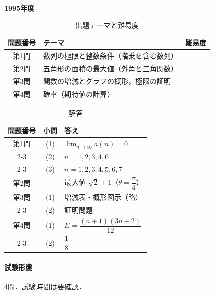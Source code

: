 \documentclass[../../main.tex]{subfiles}
\begin{document}
\begin{center}
  {\fontsize{48pt}{58pt}\selectfont \textbf{1995}\normalsize\textbf{年度}}
\end{center}

\begin{table}[htb]
  \centering
  \caption{出題テーマと難易度}
  \begin{tabular}{|c|p{9cm}|c|}
    \hline
    \textbf{問題番号} & \textbf{テーマ} & \textbf{難易度} \\
    \hline
    第1問 & 数列の極限と整数条件（階乗を含む数列） & \\
    \hline
    第2問 & 五角形の面積の最大値（外角と三角関数） & \\
    \hline
    第3問 & 関数の増減とグラフの概形，極限の証明 & \\
    \hline
    第4問 & 確率（期待値の計算） & \\
    \hline
  \end{tabular}
\end{table}

\begin{table}[htb]
  \centering
  \caption{解答}
  \renewcommand{\arraystretch}{1.4}
  \begin{tabular}{|c|c|p{9cm}|}
    \hline
    \textbf{問題番号} & \textbf{小問} & \textbf{答え} \\
    \hline
    第1問 & (1) & $\displaystyle\lim_{n\to\infty}a(n)=0$ \\
    \cline{2-3}
    & (2) & $n=1,2,3,4,6$ \\
    \cline{2-3}
    & (3) & $n=1,2,3,4,5,6,7$ \\
    \hline
    第2問 & - & 最大値 $\sqrt{2}+1$（$\theta=\dfrac{\pi}{4}$） \\
    \hline
    第3問 & (1) & 増減表・概形図示（略） \\
    \cline{2-3}
    & (2) & 証明問題 \\
    \hline
    第4問 & (1) & $E=\dfrac{(n+1)(3n+2)}{12}$ \\
    \cline{2-3}
    & (2) & $\dfrac{1}{8}$ \\
    \hline
  \end{tabular}
\end{table}

\paragraph{試験形態}
4問．試験時間は要確認．
\end{document}
